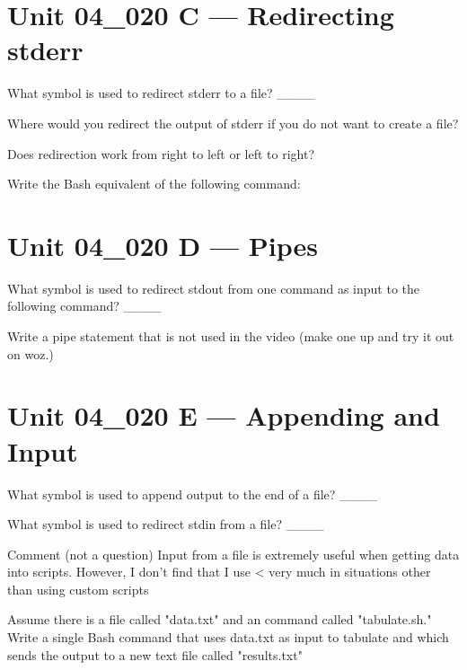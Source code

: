 \documentclass[letterpaper,12pt]{exam}
\newcommand{\unit}{Unit 04}
\begin{document}
\begin {questions}
\section*{\unit\_020 C --- Redirecting stderr} %

\question What symbol is used to redirect stderr to a file? \_\_\_\_

\question Where would you redirect the output of stderr if you do not want to create a file?

\question Does redirection work from right to left or left to right?

\question Write the Bash equivalent of the following command:\newline
\centerline{}
\vspace{5mm}

\section*{\unit\_020 D --- Pipes}

\question What symbol is used to redirect stdout from one command as input to the following command? \_\_\_\_

\begin{samepage}
	\question Write a pipe statement that is not used in the video (make one up and try it out on woz.)
	\vspace{5mm}
\end{samepage}


\section*{\unit\_020 E --- Appending and Input} %
\question What symbol is used to append output to the end of a file? \_\_\_\_

\question What symbol is used to redirect stdin from a file? \_\_\_\_

\begin{samepage}
	\question Comment (not a question)  Input from a file is extremely useful when getting data into scripts.  However, I don't find that I use < very much in situations other than using custom scripts
	\vspace{5mm}
\end{samepage}

\begin{samepage}
	\question Assume there is a file called "data.txt" and an command called "tabulate.sh."  Write a single Bash command that uses data.txt as input to tabulate and which sends the output to a new text file called "results.txt"
	\vspace{5mm}


\end{samepage}
\end{questions}
\end{document}

